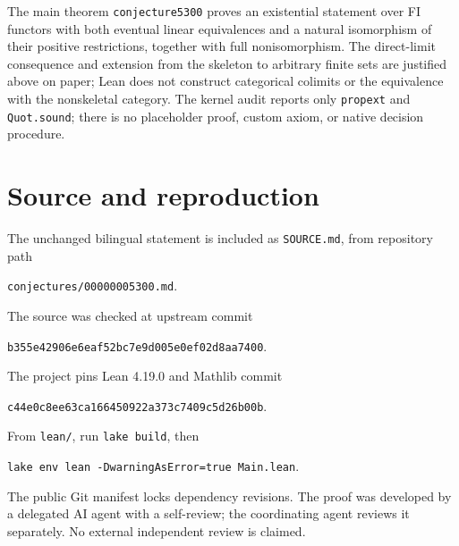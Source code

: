 \documentclass[11pt]{article}
\begin{document}
The main theorem \texttt{conjecture5300} proves an existential statement
over FI functors with both eventual linear equivalences and a natural
isomorphism of their positive restrictions, together with full
nonisomorphism. The direct-limit consequence and extension from the
skeleton to arbitrary finite sets are justified above on paper; Lean
does not construct categorical colimits or the equivalence with the
nonskeletal category. The kernel audit reports only \texttt{propext}
and \texttt{Quot.sound}; there is no placeholder proof, custom axiom, or
native decision procedure.

\section*{Source and reproduction}
The unchanged bilingual statement is included as \texttt{SOURCE.md},
from repository path
\begin{center}\texttt{conjectures/00000005300.md}.\end{center}
The source was checked at upstream commit
\begin{center}\small\texttt{b355e42906e6eaf52bc7e9d005e0ef02d8aa7400}.\end{center}
The project pins Lean 4.19.0 and Mathlib commit
\begin{center}\small\texttt{c44e0c8ee63ca166450922a373c7409c5d26b00b}.\end{center}
From \texttt{lean/}, run \texttt{lake build}, then
\begin{center}\small\texttt{lake env lean -DwarningAsError=true Main.lean}.\end{center}
The public Git manifest locks dependency revisions. The proof was
developed by a delegated AI agent with a self-review; the coordinating
agent reviews it separately. No external independent review is claimed.
\end{document}
